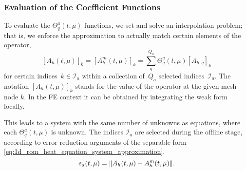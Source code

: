 \documentclass[../../1_heat_equation.tex]{subfiles}
\begin{document}
\subsubsection{Evaluation of the Coefficient Functions}
To evaluate the $\Theta_q^a(t, \mu)$ functions, we set and solve an interpolation problem;
that is, 
we enforce the approximation to actually match certain elements of the operator, 
\begin{equation}
    \label{eq:1d_rom_heat_equation_interpolation_problem}
    [A_h(t, \mu)]_{k} = [A_h^m(t, \mu)]_{k} = \sum_q^{Q_a} \Theta_q^a(t, \mu) [A_{h, q}]_{k}
\end{equation}
for certain indices~$k \in \mathcal{I}_a$ within a collection of~$Q_a$ selected indices~$\mathcal{I}_a$.
The notation $[A_h(t, \mu)]_{k}$ stands for the value of the operator at the given mesh node $k$.
In the FE context it can be obtained by integrating the weak form locally.

This leads to a system with the same number of unknowns as equations, where each $\Theta_q^a(t, \mu)$ is unknown.
The indices $\mathcal{I}_a$ are selected during the offline stage, according to error reduction arguments of the separable form \eqref{eq:1d_rom_heat_equation_system_approximation},
\begin{equation}
    e_a(t, \mu) = \norm{A_h(t, \mu) - A_h^m(t, \mu)}.
\end{equation}
\end{document}
